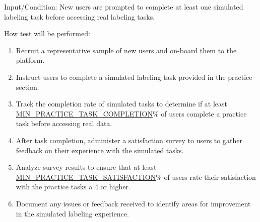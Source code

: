 \documentclass[12pt, titlepage]{article}
\begin{document}
\begin{enumerate}
Input/Condition: New users are prompted to complete at least one simulated labeling task before accessing real labeling tasks.

How test will be performed:
\begin{enumerate}
    \item Recruit a representative sample of new users and on-board them to the platform.
    \item Instruct users to complete a simulated labeling task provided in the practice section.
    \item Track the completion rate of simulated tasks to determine if at least \hyperref[MIN_PRACTICE_TASK_COMPLETION]{MIN\_PRACTICE\_TASK\_COMPLETION}\% of users complete a practice task before accessing real data.
    \item After task completion, administer a satisfaction survey to users to gather feedback on their experience with the simulated tasks.
    \item Analyze survey results to ensure that at least \\ \hyperref[MIN_PRACTICE_TASK_SATISFACTION]{MIN\_PRACTICE\_TASK\_SATISFACTION}\% of users rate their satisfaction with the practice tasks a 4 or higher.
    \item Document any issues or feedback received to identify areas for improvement in the simulated labeling experience.
\end{enumerate}


\end{enumerate}

\end{document}
